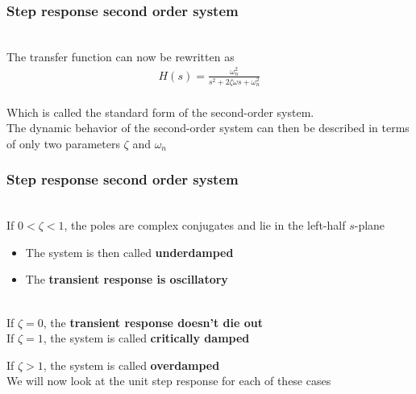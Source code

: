\begin{frame}
\frametitle{Step response second order system}
\\ The transfer function can now be rewritten as
\\ \vspace{-0.5cm}
\begin{align*}
H(s) = \frac{\omega_n ^2}{s^2+2\zeta\omega s +\omega_n ^2}
\end{align*}
\vspace{0.2cm}
\pause
\\ Which is called the standard form of the second-order system.
\vspace{0.25cm}
\pause
\vspace{0.3cm}
\\ The dynamic behavior of the second-order system can then be described in terms of only two parameters $\zeta$ and $\omega_n$ 
\end{frame}

\begin{frame}
\frametitle{Step response second order system}
\\If $0<\zeta<1$, the poles are complex conjugates and lie in the left-half $s$-plane
\begin{itemize}
\item The system is then called \textbf{underdamped}
\vspace{0.15cm}
\item The \textbf{transient response is oscillatory}
\end{itemize}
\vspace{0.35cm}
\pause
\\ If $\zeta=0$, the \textbf{transient response doesn't die out}
\vspace{0.35cm}
\pause
\\ If $\zeta=1$, the system is called \textbf{critically damped}
\vspace{0.35cm}
\pause
\item If $\zeta>1$, the system is called \textbf{overdamped}
\vspace{0.35cm}
\\ We will now look at the unit step response for each of these cases
\end{frame}

